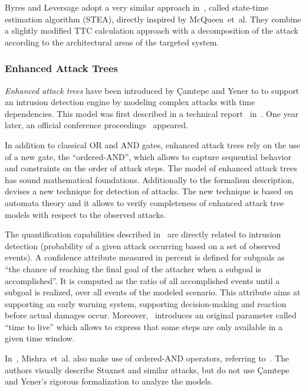 \documentclass[a4paper]{article}
\begin{document}
Byres and Leversage adopt a very similar approach in~\cite{LeBy,LeBy2}, called
state-time estimation algorithm (STEA), directly inspired by McQueen~et~al.
They combine a slightly modified TTC calculation approach with a decomposition
of the attack according to the architectural areas of the targeted system.

\subsubsection{Enhanced Attack Trees} 
\label{sec:enhanced_attack_trees}

\emph{Enhanced attack trees} have been introduced by \c{C}amtepe and Yener to to
support an intrusion detection engine by modeling complex attacks with time
dependencies.  This model was first described in a technical
report~\cite{Camtepe2006} in~. One year later, an official conference
proceedings~\cite{CaYe} appeared.

In addition to classical OR and AND gates, enhanced attack trees rely on the use
of a new gate, the ``ordered-AND'', which allows to capture sequential behavior
and constraints on the order of attack steps.  The model of enhanced attack
trees has sound mathematical foundations. Additionally to the formalism
description,~\cite{CaYe} devises  a new technique for detection of attacks.  The
new technique is based  on automata theory and it allows to verify completeness
of  enhanced attack tree models with respect to the observed attacks.

The quantification capabilities described in~\cite{CaYe} are  directly related 
to intrusion detection (probability of a given attack occurring based on a set
of observed events). A confidence attribute measured in percent is defined for
subgoals as ``the chance of reaching the final goal of the attacker when a
subgoal is accomplished''. It is computed as the ratio of all accomplished
events until a subgoal is realized, over all events of the modeled scenario.
This attribute aims at supporting an early warning system, supporting
decision-making and reaction before actual damages occur. Moreover,~\cite{CaYe}
introduces an original parameter  called ``time to live'' which allows to
express that some steps are  only available in a given time window.

In~\cite{MiKaYa}, Mishra~et~al. also make use of ordered-AND operators,
referring to~\cite{CaYe}. The authors visually describe Stuxnet and
similar attacks, but do not use \c{C}amtepe and Yener's rigorous formalization
to analyze the models.
\end{document}
